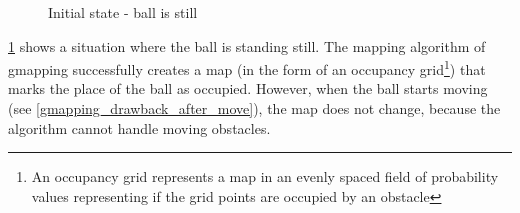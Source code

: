 \begin{figure}[!ht]
    \centering
    \caption{Initial state - ball is still}
    \label{gmapping_drawback_before_move}
\end{figure}

\ref{gmapping_drawback_before_move} shows a situation where the ball is standing still. The mapping algorithm of gmapping successfully creates a map (in the form of an occupancy grid\footnote{An occupancy grid represents a map in an evenly spaced field of probability values representing if the grid points are occupied by an obstacle}) that marks the place of the ball as occupied. However, when the ball starts moving (see \ref{gmapping_drawback_after_move}), the map does not change, because the algorithm cannot handle moving obstacles.

